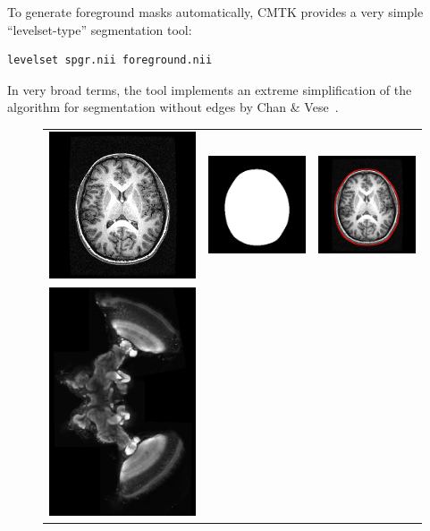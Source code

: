 \documentclass{InsightArticle}
\begin{document}
To generate foreground masks automatically, CMTK provides a very simple
``levelset-type'' segmentation tool:
\begin{verbatim}
levelset spgr.nii foreground.nii
\end{verbatim}
In very broad terms, the tool implements an extreme simplification of the
algorithm for segmentation without edges by Chan \& Vese~\cite{ChanVese:2001}.

\begin{figure}[tb]
\begin{center}
\begin{tabular}{ccc}
\includegraphics[width=.3\linewidth]{img/levelset_spgr_spgr}&
\includegraphics[width=.3\linewidth]{img/levelset_spgr_mask}&
\includegraphics[width=.3\linewidth]{img/levelset_spgr_ovl} \\
\includegraphics[width=.3\linewidth]{img/levelset_locust_clsm}&

\end{tabular}
\end{center}
\end{figure}
\end{document}
